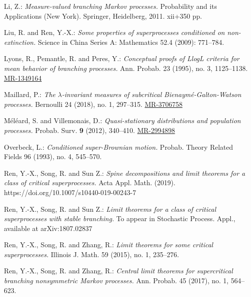 \documentclass[12pt,a4paper]{amsart}
\numberwithin{equation}{section}
\theoremstyle{plain}
\theoremstyle{definition}
\theoremstyle{remark}
\def\MR#1{\href{http://www.ams.org/mathscinet-getitem?mr=#1}{MR-#1}}
\begin{document}
\begin{thebibliography}{99}
	Li, Z.:
	\emph{Measure-valued branching Markov processes.}
	Probability and its Applications (New York). Springer, Heidelberg, 2011. xii+350 pp.
	
Liu, R. and Ren, Y.-X.:
	\emph{Some properties of superprocesses conditioned on non-extinction.}
	Science in China Series A: Mathematics 52.4 (2009): 771--784.
	
Lyons, R., Pemantle, R. and Peres, Y.:
	\emph{Conceptual proofs of LlogL criteria for mean behavior of branching processes.}
	Ann. Probab. 23 (1995), no. 3, 1125--1138.
	\MR{1349164}
	
	Maillard, P.:
	\emph{The $\lambda$-invariant measures of subcritical Bienaym\'e-Galton-Watson processes.}
	Bernoulli 24 (2018), no. 1, 297--315.
	\MR{3706758}

	M\'el\'eard, S. and Villemonais, D.:
	\emph{Quasi-stationary distributions and population processes.}
	Probab. Surv. \textbf{9} (2012),
	340--410.
	\MR{2994898}
	
	Overbeck, L.:
	\emph{Conditioned super-Brownian motion.}
	Probab. Theory Related Fields 96 (1993), no. 4,
	545--570.
	
Ren, Y.-X., Song, R. and Sun Z.:
	\emph{Spine decompositions and limit theorems for a class of critical superprocesses.}
 Acta Appl. Math. (2019). https://doi.org/10.1007/s10440-019-00243-7 
	
Ren, Y.-X., Song, R. and Sun Z.:
	\emph{Limit theorems for a class of critical superprocesses with stable branching.}
To appear in Stochastic Process. Appl., available at arXiv:1807.02837
	

Ren, Y.-X., Song, R. and Zhang, R.:
	\emph{Limit theorems for some critical superprocesses.}
	Illinois J. Math. 59 (2015), no. 1, 235--276.

Ren, Y.-X., Song, R. and Zhang, R.:
	\emph{Central limit theorems for supercritical branching nonsymmetric Markov processes.}
	Ann. Probab. 45 (2017), no. 1, 564--623.
	

\end{thebibliography}
\end{document}
